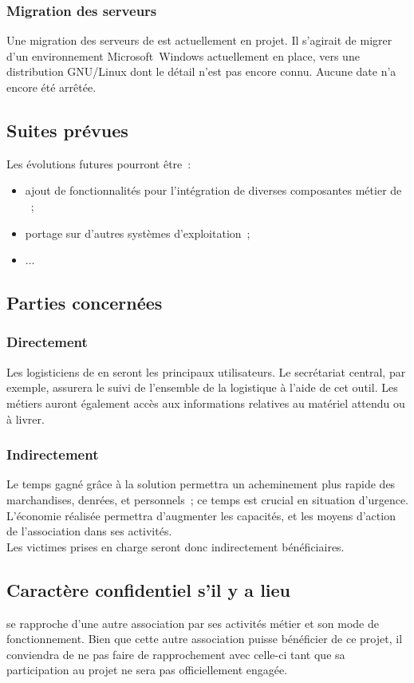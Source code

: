 \subsubsection{Migration des serveurs}
Une migration des serveurs de \mo est actuellement en projet.
Il s'agirait de migrer d'un environnement Microsoft~Windows actuellement en place, vers une distribution GNU/Linux dont le détail n'est pas encore connu.
Aucune date n'a encore été arrêtée.

\subsection{Suites prévues}
Les évolutions futures pourront être~:
\begin{itemize}
	\item ajout de fonctionnalités pour l'intégration de diverses composantes métier de \mo~;
	\item portage sur d'autres systèmes d'exploitation~;
	\item ...
\end{itemize}

\subsection{Parties concernées}

\subsubsection{Directement}
Les logisticiens de \mo en seront les principaux utilisateurs.
Le secrétariat central, par exemple, assurera le suivi de l'ensemble de la logistique à l'aide de cet outil.
Les métiers auront également accès aux informations relatives au matériel attendu ou à livrer.

\subsubsection{Indirectement}
Le temps gagné grâce à la solution permettra un acheminement plus rapide des marchandises, denrées, et personnels~; ce temps est crucial en situation d'urgence.
L'économie réalisée permettra d'augmenter les capacités, et les moyens d'action de l'association dans ses activités.
\\
Les victimes prises en charge seront donc indirectement bénéficiaires.

\subsection{Caractère confidentiel s'il y a lieu}
\mo se rapproche d'une autre association par ses activités métier et son mode de fonctionnement.
Bien que cette autre association puisse bénéficier de ce projet, il conviendra de ne pas faire de rapprochement avec celle-ci tant que sa participation au projet ne sera pas officiellement engagée.

